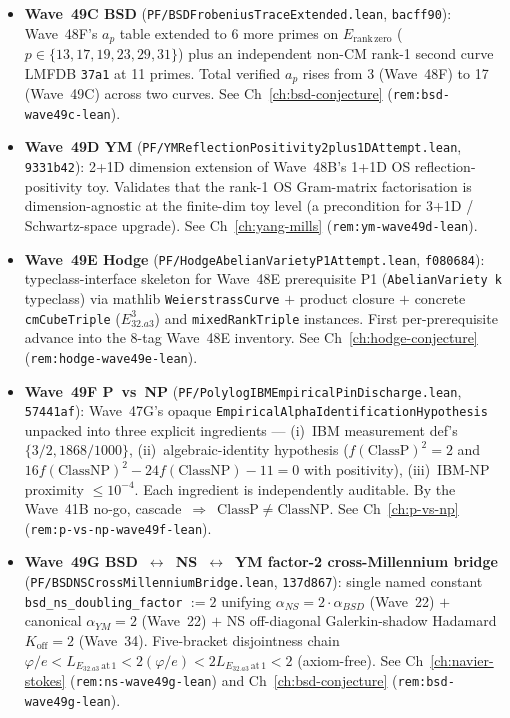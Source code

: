 \begin{remark}
\begin{itemize}
  \item \textbf{Wave~49C BSD} (\texttt{PF/BSDFrobeniusTraceExtended.lean}, \texttt{bacff90}): Wave~48F's $a_p$ table extended to 6 more primes on $E_{\mathrm{rank\,zero}}$ ($p \in \{13, 17, 19, 23, 29, 31\}$) plus an independent non-CM rank-1 second curve LMFDB \texttt{37a1} at 11 primes. Total verified $a_p$ rises from 3 (Wave~48F) to 17 (Wave~49C) across two curves. See Ch~\ref{ch:bsd-conjecture} (\texttt{rem:bsd-wave49c-lean}).
  \item \textbf{Wave~49D YM} (\texttt{PF/YMReflectionPositivity2plus1DAttempt.lean}, \texttt{9331b42}): 2+1D dimension extension of Wave~48B's 1+1D OS reflection-positivity toy. Validates that the rank-1 OS Gram-matrix factorisation is dimension-agnostic at the finite-dim toy level (a precondition for 3+1D / Schwartz-space upgrade). See Ch~\ref{ch:yang-mills} (\texttt{rem:ym-wave49d-lean}).
  \item \textbf{Wave~49E Hodge} (\texttt{PF/HodgeAbelianVarietyP1Attempt.lean}, \texttt{f080684}): typeclass-interface skeleton for Wave~48E prerequisite P1 (\texttt{AbelianVariety k} typeclass) via mathlib \texttt{WeierstrassCurve} $+$ product closure $+$ concrete \texttt{cmCubeTriple} ($E_{32.a3}^3$) and \texttt{mixedRankTriple} instances. First per-prerequisite advance into the 8-tag Wave~48E inventory. See Ch~\ref{ch:hodge-conjecture} (\texttt{rem:hodge-wave49e-lean}).
  \item \textbf{Wave~49F P~vs~NP} (\texttt{PF/PolylogIBMEmpiricalPinDischarge.lean}, \texttt{57441af}): Wave~47G's opaque \texttt{EmpiricalAlphaIdentificationHypothesis} unpacked into three explicit ingredients --- (i)~IBM measurement def's $\{3/2, 1868/1000\}$, (ii)~algebraic-identity hypothesis ($f(\mathrm{ClassP})^2 = 2$ and $16 f(\mathrm{ClassNP})^2 - 24 f(\mathrm{ClassNP}) - 11 = 0$ with positivity), (iii)~IBM-NP proximity $\leq 10^{-4}$. Each ingredient is independently auditable. By the Wave~41B no-go, cascade~$\Rightarrow$~$\mathrm{ClassP} \neq \mathrm{ClassNP}$. See Ch~\ref{ch:p-vs-np} (\texttt{rem:p-vs-np-wave49f-lean}).
  \item \textbf{Wave~49G BSD~$\leftrightarrow$~NS~$\leftrightarrow$~YM factor-2 cross-Millennium bridge} (\texttt{PF/BSDNSCrossMillenniumBridge.lean}, \texttt{137d867}): single named constant \texttt{bsd\_ns\_doubling\_factor} $:= 2$ unifying $\alpha_{NS} = 2 \cdot \alpha_{BSD}$ (Wave~22) $+$ canonical $\alpha_{YM} = 2$ (Wave~22) $+$ NS off-diagonal Galerkin-shadow Hadamard $K_{\mathrm{off}} = 2$ (Wave~34). Five-bracket disjointness chain $\varphi/e < L_{E_{32.a3}\,\mathrm{at}\,1} < 2(\varphi/e) < 2 L_{E_{32.a3}\,\mathrm{at}\,1} < 2$ (axiom-free). See Ch~\ref{ch:navier-stokes} (\texttt{rem:ns-wave49g-lean}) and Ch~\ref{ch:bsd-conjecture} (\texttt{rem:bsd-wave49g-lean}).

\end{itemize}
\end{remark}
